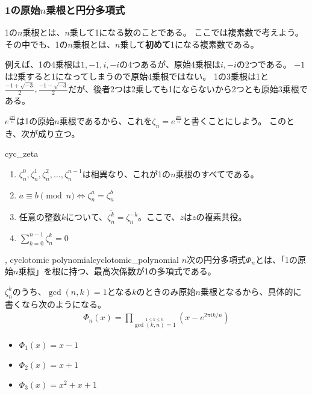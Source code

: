\subsubsection{1の原始$n$乗根と円分多項式}
1の$n$乗根とは、$n$乗して1になる数のことである。
ここでは複素数で考えよう。
その中でも、1の$n$乗根とは、$n$乗して\textbf{初めて}1になる複素数である。

例えば、1の4乗根は$1,-1,i,-i$の4つあるが、原始4乗根は$i,-i$の2つである。
$-1$は2乗すると1になってしまうので原始4乗根ではない。
1の3乗根は1と$\frac{-1+\sqrt{-3}}{2},\frac{-1-\sqrt{-3}}{2}$だが、後者2つは2乗しても1にならないから2つとも原始3乗根である。

$e^{\frac{2\pi i}{n}}$は1の原始$n$乗根であるから、これを$\zeta_n=e^{\frac{2\pi i}{n}}$と書くことにしよう。
このとき、次が成り立つ。

\begin{Prop}{}{cyc_zeta}\;
\begin{enumerate}
 \item $\zeta_n^0,\zeta_n^1,\zeta_n^2,\ldots,\zeta_n^{n-1}$は相異なり、これが1の$n$乗根のすべてである。
 \item $a\equiv b \pmod{n} \iff \zeta_n^a = \zeta_n^b$
 \item 任意の整数$k$について、$\overline{\zeta_n^k} = \zeta_n^{-k}$。ここで、$\overline{z}$は$z$の複素共役。
 \item $\sum_{k=0}^{n-1} \zeta_n^k = 0$
\end{enumerate}
\end{Prop}

\begin{Defi}{, cyclotomic polynomial}{cyclotomic_polynomial}
$n$次の円分多項式$\Phi_n$とは、「1の原始$n$乗根」を根に持つ、最高次係数が1の多項式である。
\end{Defi}

$\zeta_n^k$のうち、$\gcd(n,k)=1$となる$k$のときのみ原始$n$乗根となるから、具体的に書くなら次のようになる。
\begin{align*}
\Phi_n(x)=\prod_{\stackrel{1 \le k \le n}{\gcd(k,n)=1}}(x - e^{2\pi ik/n})
\end{align*}

\begin{Exam}{}{}\;
\begin{itemize}
 \item $\Phi_1(x) = x-1$
 \item $\Phi_2(x) = x+1$
 \item $\Phi_3(x) = x^2+x+1$
\end{itemize}
\end{Exam}

